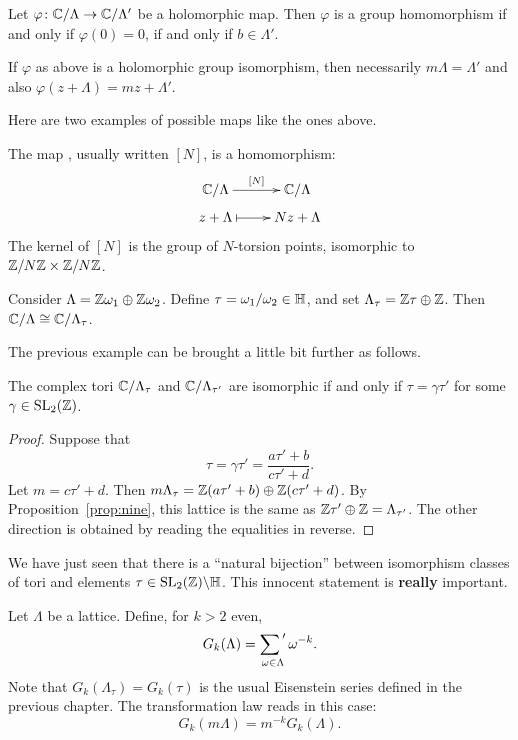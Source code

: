 \begin{corollary}
  Let $\varphi\colon\mathbb{C}/\Lambda\to\mathbb{C}/\Lambda'$ be a holomorphic map. Then $\varphi$ is a group homomorphism if and only if $\varphi(0)=0$, if and only if $b\in\Lambda'$.
\end{corollary}

\begin{remark}
  If $\varphi$ as above is a holomorphic group isomorphism, then necessarily $m\Lambda=\Lambda'$ and also $\varphi(z+\Lambda)=mz+\Lambda'$.
\end{remark}

Here are two examples of possible maps like the ones above.
\begin{example}
  The map , usually written $[N]$, is a homomorphism:
\[
\xymatrix@R5pt{\CC/\Lambda\ar[r]^{[N]}&\CC/\Lambda\\
z+\Lambda\ar@{|->}[r]&Nz+\Lambda
}
\]
The kernel of $[N]$ is the group of $N$-torsion points, isomorphic to $\mathbb{Z}/N\mathbb{Z}\times\mathbb{Z}/N\mathbb{Z}$.
\end{example}

\begin{example}
  Consider $\Lambda=\mathbb{Z}\omega_1\oplus\mathbb{Z}\omega_2$. Define $\tau=\omega_1/\omega_2\in \mathbb{H}$, and set $\Lambda_\tau=\mathbb{Z}\tau\oplus\mathbb{Z}$. Then $\mathbb{C}/\Lambda\cong \mathbb{C}/\Lambda_\tau$.
\end{example}

The previous example can be brought a little bit further as follows.
\begin{lemma}
  The complex tori $\mathbb{C}/\Lambda_\tau$ and $\mathbb{C}/\Lambda_{\tau'}$ are isomorphic if and only if $\tau=\gamma\tau'$ for some $\gamma\in\operatorname{SL}_2(\mathbb{Z})$.
\end{lemma}
\begin{proof}
  Suppose that
\[
\tau=\gamma\tau'=\frac{a\tau'+b}{c\tau'+d}.
\]
Let $m=c\tau'+d$. Then $m\Lambda_\tau = \mathbb{Z}(a\tau'+b)\oplus\mathbb{Z}(c\tau'+d)$. By Proposition~\ref{prop:nine}, this lattice is the same as $\mathbb{Z}\tau'\oplus\mathbb{Z}=\Lambda_{\tau'}$. The other direction is obtained by reading the equalities in reverse.
\end{proof}
\begin{remark}
  We have just seen that there is a ``natural bijection'' between isomorphism classes of tori and elements $\tau\in\operatorname{SL}_2(\mathbb{Z})\backslash\mathbb{H}$. This innocent statement is \textbf{really} important.
\end{remark}

\begin{example}
  Let $\Lambda$ be a lattice. Define, for $k>2$ even,
\[
G_k(\Lambda)=\sumprime_{\omega\in\Lambda}\omega^{-k}.
\]
Note that $G_k(\Lambda_\tau) = G_k(\tau)$ is the usual Eisenstein series defined in the previous chapter. The transformation law reads in this case:
\[
G_k(m\Lambda)=m^{-k}G_k(\Lambda).
\]
\end{example}
